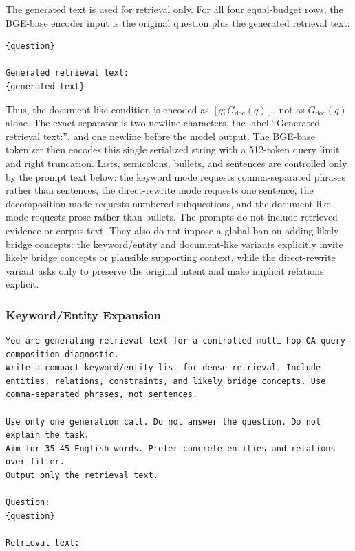 \documentclass[10pt]{article}
\begin{document}
The generated text is used for retrieval only. For all four equal-budget rows, the BGE-base encoder input is the original question plus the generated retrieval text:
\begingroup\footnotesize
\begin{verbatim}
{question}

Generated retrieval text:
{generated_text}
\end{verbatim}
\endgroup
Thus, the document-like condition is encoded as $[q;G_{\mathrm{doc}}(q)]$, not as $G_{\mathrm{doc}}(q)$ alone. The exact separator is two newline characters, the label ``Generated retrieval text:'', and one newline before the model output. The BGE-base tokenizer then encodes this single serialized string with a 512-token query limit and right truncation. Lists, semicolons, bullets, and sentences are controlled only by the prompt text below: the keyword mode requests comma-separated phrases rather than sentences, the direct-rewrite mode requests one sentence, the decomposition mode requests numbered subquestions, and the document-like mode requests prose rather than bullets. The prompts do not include retrieved evidence or corpus text. They also do not impose a global ban on adding likely bridge concepts: the keyword/entity and document-like variants explicitly invite likely bridge concepts or plausible supporting context, while the direct-rewrite variant asks only to preserve the original intent and make implicit relations explicit.

\subsubsection*{Keyword/Entity Expansion}
\begingroup\footnotesize
\begin{Verbatim}[breaklines=true,breakanywhere=false,breaksymbolleft={},breaksymbolright={}]
You are generating retrieval text for a controlled multi-hop QA query-composition diagnostic.
Write a compact keyword/entity list for dense retrieval. Include entities, relations, constraints, and likely bridge concepts. Use comma-separated phrases, not sentences.

Use only one generation call. Do not answer the question. Do not explain the task.
Aim for 35-45 English words. Prefer concrete entities and relations over filler.
Output only the retrieval text.

Question:
{question}

Retrieval text:
\end{Verbatim}
\endgroup
\end{document}
